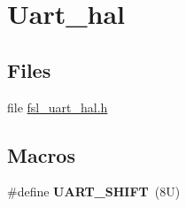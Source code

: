 \hypertarget{group__uart__hal}{}\section{Uart\+\_\+hal}
\label{group__uart__hal}
\subsection*{Files}
\begin{DoxyCompactItemize}
\item 
file \hyperlink{fsl__uart__hal_8h}{fsl\+\_\+uart\+\_\+hal.\+h}
\end{DoxyCompactItemize}
\subsection*{Macros}
\begin{DoxyCompactItemize}
\item 
\#define {\bfseries U\+A\+R\+T\+\_\+\+S\+H\+I\+FT}~(8\+U)\hypertarget{group__uart__hal_gad83d258837467b9702bc42da97566ef1}{}\label{group__uart__hal_gad83d258837467b9702bc42da97566ef1}

\end{DoxyCompactItemize}
